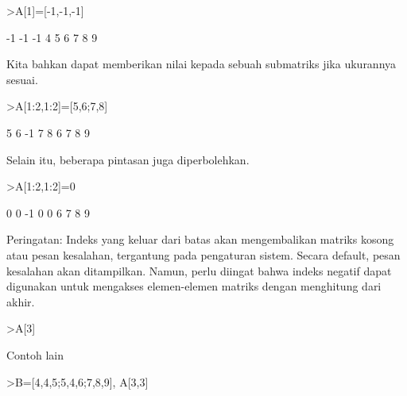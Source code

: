 \documentclass[12pt,arial,letterpaper]{book}
\begin{document}
\begin{eulercomment}
\begin{eulercomment}
\begin{eulercomment}
\begin{eulercomment}
\begin{eulercomment}
\begin{eulercomment}
\begin{eulercomment}
\begin{eulercomment}
\begin{eulercomment}
\end{eulercomment}
\begin{eulerprompt}
>A[1]=[-1,-1,-1]
\end{eulerprompt}
\begin{euleroutput}
             -1            -1            -1 
              4             5             6 
              7             8             9 
\end{euleroutput}
\begin{eulercomment}
Kita bahkan dapat memberikan nilai kepada sebuah submatriks jika
ukurannya sesuai.
\end{eulercomment}
\begin{eulerprompt}
>A[1:2,1:2]=[5,6;7,8]
\end{eulerprompt}
\begin{euleroutput}
              5             6            -1 
              7             8             6 
              7             8             9 
\end{euleroutput}
\begin{eulercomment}
Selain itu, beberapa pintasan juga diperbolehkan.
\end{eulercomment}
\begin{eulerprompt}
>A[1:2,1:2]=0
\end{eulerprompt}
\begin{euleroutput}
              0             0            -1 
              0             0             6 
              7             8             9 
\end{euleroutput}
\begin{eulercomment}
Peringatan: Indeks yang keluar dari batas akan mengembalikan matriks
kosong atau pesan kesalahan, tergantung pada pengaturan sistem. Secara
default, pesan kesalahan akan ditampilkan. Namun, perlu diingat bahwa
indeks negatif dapat digunakan untuk mengakses elemen-elemen matriks
dengan menghitung dari akhir.
\end{eulercomment}
\begin{eulerprompt}
>A[3]
\end{eulerprompt}
\begin{euleroutput}
  [7,  8,  9]
\end{euleroutput}
\begin{eulercomment}
Contoh lain
\end{eulercomment}
\begin{eulerprompt}
>B=[4,4,5;5,4,6;7,8,9], A[3,3]
\end{eulerprompt}
\begin{euleroutput}

\end{euleroutput}
\end{eulercomment}
\end{eulercomment}
\end{eulercomment}
\end{eulercomment}
\end{eulercomment}
\end{eulercomment}
\end{eulercomment}
\end{eulercomment}
\end{document}
